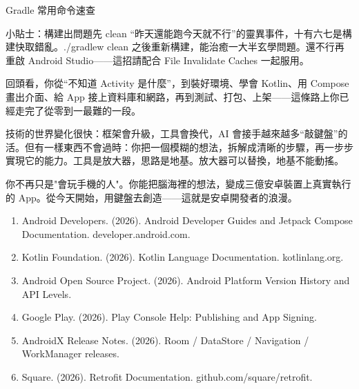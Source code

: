 \begin{center}\small\color{gray}Gradle 常用命令速查\end{center}

\begin{tcbinfo}{小貼士：構建出問題先 clean}
“昨天還能跑今天就不行”的靈異事件，十有六七是構建快取錯亂。./gradlew clean 之後重新構建，能治癒一大半玄學問題。還不行再重啟 Android Studio——這招請配合 File Invalidate Caches 一起服用。

\end{tcbinfo}



回頭看，你從“不知道 Activity 是什麼”，到裝好環境、學會 Kotlin、用 Compose 畫出介面、給 App 接上資料庫和網路，再到測試、打包、上架——這條路上你已經走完了從零到一最難的一段。

技術的世界變化很快：框架會升級，工具會換代，AI 會接手越來越多“敲鍵盤”的活。但有一樣東西不會過時：你把一個模糊的想法，拆解成清晰的步驟，再一步步實現它的能力。工具是放大器，思路是地基。放大器可以替換，地基不能動搖。

你不再只是"會玩手機的人"。你能把腦海裡的想法，變成三億安卓裝置上真實執行的 App。從今天開始，用鍵盤去創造——這就是安卓開發者的浪漫。


\begin{enumerate}
  \item Android Developers. (2026). Android Developer Guides and Jetpack Compose Documentation. developer.android.com.
  \item Kotlin Foundation. (2026). Kotlin Language Documentation. kotlinlang.org.
  \item Android Open Source Project. (2026). Android Platform Version History and API Levels.
  \item Google Play. (2026). Play Console Help: Publishing and App Signing.
  \item AndroidX Release Notes. (2026). Room / DataStore / Navigation / WorkManager releases.
  \item Square. (2026). Retrofit Documentation. github.com/square/retrofit.
\end{enumerate}
